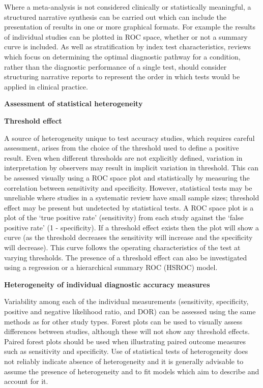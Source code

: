 \documentclass[
  11pt,
  a4paper,
  DIV=11,
  numbers=noendperiod]{scrreprt}
\begin{document}
Where a meta-analysis is not considered clinically or statistically
meaningful, a structured narrative synthesis can be carried out which
can include the presentation of results in one or more graphical
formats. For example the results of individual studies can be plotted in
ROC space, whether or not a summary curve is included. As well as
stratification by index test characteristics, reviews which focus on
determining the optimal diagnostic pathway for a condition, rather than
the diagnostic performance of a single test, should consider structuring
narrative reports to represent the order in which tests would be applied
in clinical practice.

\textbf{Assessment of statistical heterogeneity}

\textbf{Threshold effect}

A source of heterogeneity unique to test accuracy studies, which
requires careful assessment, arises from the choice of the threshold
used to define a positive result. Even when different thresholds are not
explicitly defined, variation in interpretation by observers may result
in implicit variation in threshold. This can be assessed visually using
a ROC space plot and statistically by measuring the correlation between
sensitivity and specificity. However, statistical tests may be
unreliable where studies in a systematic review have small sample sizes;
threshold effect may be present but undetected by statistical tests. A
ROC space plot is a plot of the `true positive rate' (sensitivity) from
each study against the `false positive rate' (1 - specificity). If a
threshold effect exists then the plot will show a curve (as the
threshold decreases the sensitivity will increase and the specificity
will decrease). This curve follows the operating characteristics of the
test at varying thresholds. The presence of a threshold effect can also
be investigated using a regression or a hierarchical summary ROC (HSROC)
model.

\textbf{Heterogeneity of individual diagnostic accuracy measures}

Variability among each of the individual measurements (sensitivity,
specificity, positive and negative likelihood ratio, and DOR) can be
assessed using the same methods as for other study types. Forest plots
can be used to visually assess differences between studies, although
these will not show any threshold effects. Paired forest plots should be
used when illustrating paired outcome measures such as sensitivity and
specificity. Use of statistical tests of heterogeneity does not reliably
indicate absence of heterogeneity and it is generally advisable to
assume the presence of heterogeneity and to fit models which aim to
describe and account for it.
\end{document}
